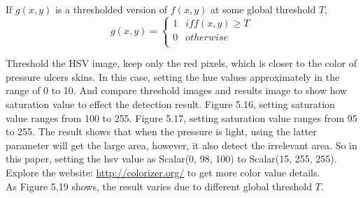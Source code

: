 If $g(x, y)$ is a thresholded version of $f(x, y)$ at some global threshold $T$,
\[
    g(x,y)=\left\{
                \begin{array}{ll}
                  1 & if f(x,y)\geq T\\
                  0 & otherwise\\
                \end{array}
              \right.
  \]



Threshold the HSV image, keep only the red pixels, which is closer to the color of pressure ulcers skins. In this case, setting the hue values approximately in the range of 0 to 10. And compare threshold images and results image to show how saturation value to effect the detection result. Figure 5.16, setting saturation value ranges from 100 to 255. Figure 5.17, setting saturation value ranges from 95 to 255. The result shows that when the pressure is light, using the latter parameter will get the large area, however, it also detect the irrelevant area. So in this paper, setting the hsv value as 
Scalar(0, 98, 100) to Scalar(15, 255, 255). Explore the website: \url{http://colorizer.org/}
to get more color value details.\\

As Figure 5.19 shows, the result varies due to different global threshold $T$.

